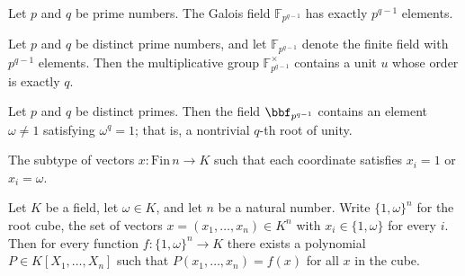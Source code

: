 \begin{lemma}
\label{RazborovSmolensky.natCard_modqField}
\leanok
{}
Let $p$ and $q$ be prime numbers. The Galois field $\mathbb{F}_{p^{q-1}}$ has exactly
$p^{q-1}$ elements.
\end{lemma}

\begin{theorem}
\label{RazborovSmolensky.exists_unit_of_order_q_modqField}
\leanok
{}
Let $p$ and $q$ be distinct prime numbers, and let $\mathbb{F}_{p^{q-1}}$ denote the
finite field with $p^{q-1}$ elements. Then the multiplicative group
$\mathbb{F}_{p^{q-1}}^{\times}$ contains a unit $u$ whose order is exactly $q$.
\end{theorem}

\begin{theorem}
\label{RazborovSmolensky.exists_nontrivial_qth_root_modqField}
\leanok
{}
Let $p$ and $q$ be distinct primes. Then the field $\bbf_{p^{q-1}}$ contains an element
$\omega \neq 1$ satisfying $\omega^{q} = 1$; that is, a nontrivial $q$-th root of unity.
\end{theorem}

\begin{definition}
\label{RazborovSmolensky.rootCube}
\leanok
The subtype of vectors $x : \mathrm{Fin}\,n \to K$ such that each coordinate satisfies
$x_i = 1$ or $x_i = \omega$.
\end{definition}

\begin{theorem}
\label{RazborovSmolensky.exists_multilinear_representative_on_rootCube}
\leanok
{}
Let $K$ be a field, let $\omega \in K$, and let $n$ be a natural number. Write
$\{1,\omega\}^n$ for the root cube, the set of vectors $x = (x_1,\dots,x_n) \in K^n$
with $x_i \in \{1,\omega\}$ for every $i$. Then for every function $f : \{1,\omega\}^n
\to K$ there exists a polynomial $P \in K[X_1,\dots,X_n]$ such that $P(x_1,\dots,x_n) =
f(x)$ for all $x$ in the cube.
\end{theorem}

